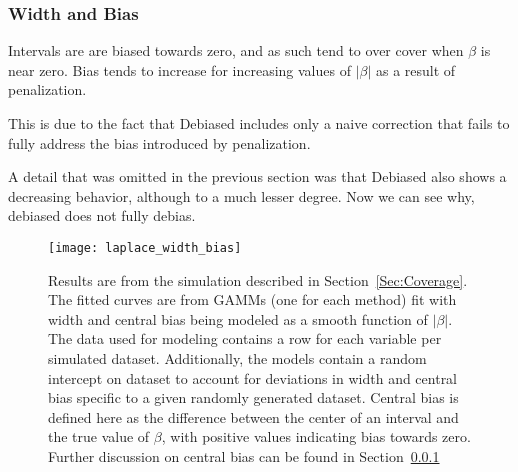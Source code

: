 \subsubsection{Width and Bias}\label{Sec:Width and Bias}


Intervals are are biased towards zero, and as such tend to over cover when $\beta$ is near zero. Bias tends to increase for increasing values of $|\beta|$ as a result of penalization.

This is due to the fact that Debiased includes only a naive correction that fails to fully address the bias introduced by penalization. 

A detail that was omitted in the previous section was that Debiased also shows a decreasing behavior, although to a much lesser degree. Now we can see why, debiased does not fully debias.

\begin{figure}
  \texttt{[image: laplace\_width\_bias]}
  \caption{\label{Fig:laplace_width_bias} Results are from the simulation described in Section~\ref{Sec:Coverage}. The fitted curves are from GAMMs (one for each method) fit with width and central bias being modeled as a smooth function of $|\beta|$. The data used for modeling contains a row for each variable per simulated dataset. Additionally, the models contain a random intercept on dataset to account for deviations in width and central bias specific to a given randomly generated dataset. Central bias is defined here as the difference between the center of an interval and the true value of $\beta$, with positive values indicating bias towards zero. Further discussion on central bias can be found in Section~\ref{Sec:Width and Bias}}
\end{figure}

